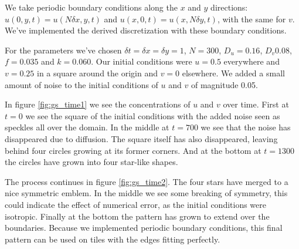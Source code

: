 \documentclass[a4paper]{article}
\begin{document}
We take periodic boundary conditions along the $x$ and $y$ directions: $u(0, y, t) = u(N \delta x, y, t)$ and $u(x, 0, t) = u(x, N \delta y, t)$, with the same for $v$. We've implemented the derived discretization with these boundary conditions. 

For the parameters we've chosen $\delta t = \delta x = \delta y = 1$, $N=300$, $D_u = 0.16$, $D_v 0.08$, $f = 0.035$ and $k = 0.060$. Our initial conditions were $u = 0.5$ everywhere and $v = 0.25$ in a square around the origin and $v = 0$ elsewhere. We added a small amount of noise to the initial conditions of $u$ and $v$ of magnitude 0.05.

In figure \ref{fig:gs_time1} we see the concentrations of $u$ and $v$ over time. First at $t=0$ we see the square of the initial conditions with the added noise seen as speckles all over the domain. In the middle at $t=700$ we see that the noise has disappeared due to diffusion. The square itself has also disappeared, leaving behind four circles growing at its former corners. And at the bottom at $t=1300$ the circles have grown into four star-like shapes.

The process continues in figure \ref{fig:gs_time2}. The four stars have merged to a nice symmetric emblem. In the middle we see some breaking of symmetry, this could indicate the effect of numerical error, as the initial conditions were isotropic. Finally at the bottom the pattern has grown to extend over the boundaries. Because we implemented periodic boundary conditions, this final pattern can be used on tiles with the edges fitting perfectly.
\end{document}
